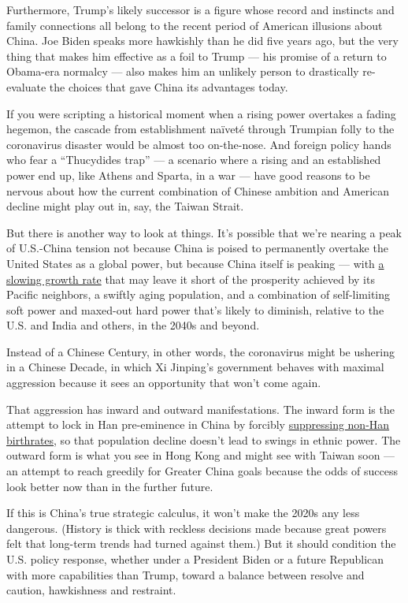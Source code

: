 Furthermore, Trump's likely successor is a figure whose record and
instincts and family connections all belong to the recent period of
American illusions about China. Joe Biden speaks more hawkishly than he
did five years ago, but the very thing that makes him effective as a
foil to Trump --- his promise of a return to Obama-era normalcy --- also
makes him an unlikely person to drastically re-evaluate the choices that
gave China its advantages today.

If you were scripting a historical moment when a rising power overtakes
a fading hegemon, the cascade from establishment naïveté through
Trumpian folly to the coronavirus disaster would be almost too
on-the-nose. And foreign policy hands who fear a ``Thucydides trap'' ---
a scenario where a rising and an established power end up, like Athens
and Sparta, in a war --- have good reasons to be nervous about how the
current combination of Chinese ambition and American decline might play
out in, say, the Taiwan Strait.

But there is another way to look at things. It's possible that we're
nearing a peak of U.S.-China tension not because China is poised to
permanently overtake the United States as a global power, but because
China itself is peaking --- with
\href{https://www.wsj.com/articles/chinas-state-driven-growth-model-is-running-out-of-gas-11563372006}{a
slowing growth rate} that may leave it short of the prosperity achieved
by its Pacific neighbors, a swiftly aging population, and a combination
of self-limiting soft power and maxed-out hard power that's likely to
diminish, relative to the U.S. and India and others, in the 2040s and
beyond.

Instead of a Chinese Century, in other words, the coronavirus might be
ushering in a Chinese Decade, in which Xi Jinping's government behaves
with maximal aggression because it sees an opportunity that won't come
again.

That aggression has inward and outward manifestations. The inward form
is the attempt to lock in Han pre-eminence in China by forcibly
\href{https://foreignpolicy.com/2020/06/30/chinese-communist-party-han-baby-boom-sterilization-ethnic-minorities/}{suppressing
non-Han birthrates}, so that population decline doesn't lead to swings
in ethnic power. The outward form is what you see in Hong Kong and might
see with Taiwan soon --- an attempt to reach greedily for Greater China
goals because the odds of success look better now than in the further
future.

If this is China's true strategic calculus, it won't make the 2020s any
less dangerous. (History is thick with reckless decisions made because
great powers felt that long-term trends had turned against them.) But it
should condition the U.S. policy response, whether under a President
Biden or a future Republican with more capabilities than Trump, toward a
balance between resolve and caution, hawkishness and restraint.

